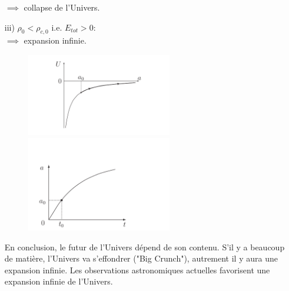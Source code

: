 \documentclass[a4paper,12pt]{report}
\theoremstyle{plain}
\theoremstyle{plain}
\begin{document}
\begin{enumerate}
$\implies $ collapse de l'Univers. 
\item[iii)] $\rho_0 < \rho_{c,0}$ i.e. $E_{tot} >0:$ \\
$ \implies$ expansion infinie. 


% 


\begin{figure}[h]
\begin{minipage}{14pc}
\includegraphics[width=15pc]{t12.png}
\caption{}
\end{minipage}\hspace{3pc}%
\begin{minipage}{14pc}
\includegraphics[width=15pc]{t13.png}
\caption{}
\end{minipage}\hspace{3pc}%
\end{figure}



En conclusion, le futur de l'Univers d\'epend de son contenu. S'il y a beaucoup de mati\`ere, l'Univers va s'effondrer ("Big Crunch"), autrement il y aura une expansion   infinie. Les observations astronomiques actuelles favorisent une expansion infinie de l'Univers.
\end{enumerate}
 
\end{document}
